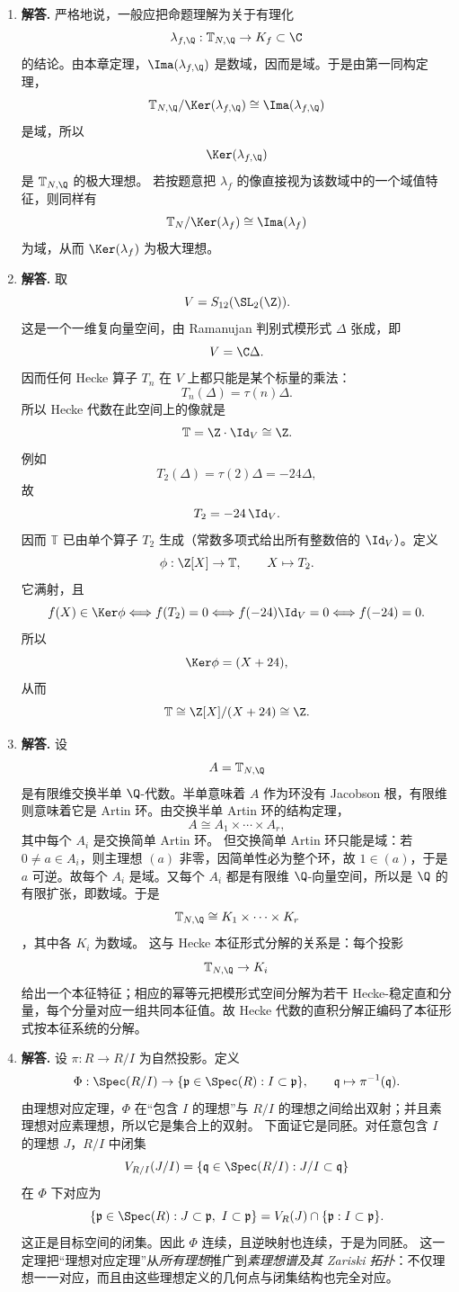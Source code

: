\begin{enumerate}[label=\textbf{\arabic*.}, leftmargin=*, itemsep=1em]
  \item \textbf{解答.} 严格地说，一般应把命题理解为关于有理化
  \[
  \lambda_{f,\Q}:\mathbb{T}_{N,\Q}\to K_f\subset\C
  \]
  的结论。由本章定理，$\Ima(\lambda_{f,\Q})$ 是数域，因而是域。于是由第一同构定理，
  \[
  \mathbb{T}_{N,\Q}/\Ker(\lambda_{f,\Q})\cong \Ima(\lambda_{f,\Q})
  \]
  是域，所以
  \[
  \Ker(\lambda_{f,\Q})
  \]
  是 $\mathbb{T}_{N,\Q}$ 的极大理想。  
  若按题意把 $\lambda_f$ 的像直接视为该数域中的一个域值特征，则同样有
  \[
  \mathbb{T}_N/\Ker(\lambda_f)\cong \Ima(\lambda_f)
  \]
  为域，从而 $\Ker(\lambda_f)$ 为极大理想。

  \item \textbf{解答.} 取
  \[
  V=S_{12}(\SL_2(\Z)).
  \]
  这是一个一维复向量空间，由 Ramanujan 判别式模形式 $\Delta$ 张成，即
  \[
  V=\C\Delta.
  \]
  因而任何 Hecke 算子 $T_n$ 在 $V$ 上都只能是某个标量的乘法：
  \[
  T_n(\Delta)=\tau(n)\Delta.
  \]
  所以 Hecke 代数在此空间上的像就是
  \[
  \mathbb{T}=\Z\cdot \Id_V\cong \Z.
  \]
  例如
  \[
  T_2(\Delta)=\tau(2)\Delta=-24\Delta,
  \]
  故
  \[
  T_2=-24\,\Id_V.
  \]
  因而 $\mathbb{T}$ 已由单个算子 $T_2$ 生成（常数多项式给出所有整数倍的 $\Id_V$）。定义
  \[
  \phi:\Z[X]\to \mathbb{T},\qquad X\mapsto T_2.
  \]
  它满射，且
  \[
  f(X)\in\Ker\phi \Longleftrightarrow f(T_2)=0
  \Longleftrightarrow f(-24)\Id_V=0
  \Longleftrightarrow f(-24)=0.
  \]
  所以
  \[
  \Ker\phi=(X+24),
  \]
  从而
  \[
  \mathbb{T}\cong \Z[X]/(X+24)\cong \Z.
  \]

  \item \textbf{解答.} 设
  \[
  A=\mathbb{T}_{N,\Q}
  \]
  是有限维交换半单 $\Q$-代数。半单意味着 $A$ 作为环没有 Jacobson 根，有限维则意味着它是 Artin 环。由交换半单 Artin 环的结构定理，
  \[
  A\cong A_1\times\cdots\times A_r,
  \]
  其中每个 $A_i$ 是交换简单 Artin 环。  
  但交换简单 Artin 环只能是域：若 $0\neq a\in A_i$，则主理想 $(a)$ 非零，因简单性必为整个环，故 $1\in(a)$，于是 $a$ 可逆。故每个 $A_i$ 是域。又每个 $A_i$ 都是有限维 $\Q$-向量空间，所以是 $\Q$ 的有限扩张，即数域。于是
  \[
  \mathbb{T}_{N,\Q}\cong K_1\times\cdots\times K_r
  \]
  ，其中各 $K_i$ 为数域。  
  这与 Hecke 本征形式分解的关系是：每个投影
  \[
  \mathbb{T}_{N,\Q}\to K_i
  \]
  给出一个本征特征；相应的幂等元把模形式空间分解为若干 Hecke-稳定直和分量，每个分量对应一组共同本征值。故 Hecke 代数的直积分解正编码了本征形式按本征系统的分解。

  \item \textbf{解答.} 设 $\pi:R\to R/I$ 为自然投影。定义
  \[
  \Phi:\Spec(R/I)\to \{\mathfrak p\in\Spec(R):I\subset \mathfrak p\},\qquad
  \mathfrak q\mapsto \pi^{-1}(\mathfrak q).
  \]
  由理想对应定理，$\Phi$ 在“包含 $I$ 的理想”与 $R/I$ 的理想之间给出双射；并且素理想对应素理想，所以它是集合上的双射。  
  下面证它是同胚。对任意包含 $I$ 的理想 $J$，$R/I$ 中闭集
  \[
  V_{R/I}(J/I)=\{\mathfrak q\in\Spec(R/I):J/I\subset\mathfrak q\}
  \]
  在 $\Phi$ 下对应为
  \[
  \{\mathfrak p\in\Spec(R):J\subset\mathfrak p,\ I\subset\mathfrak p\}
  =V_R(J)\cap \{\mathfrak p:I\subset\mathfrak p\}.
  \]
  这正是目标空间的闭集。因此 $\Phi$ 连续，且逆映射也连续，于是为同胚。  
  这一定理把“理想对应定理”从\emph{所有理想}推广到\emph{素理想谱及其 Zariski 拓扑}：不仅理想一一对应，而且由这些理想定义的几何点与闭集结构也完全对应。
\end{enumerate}
